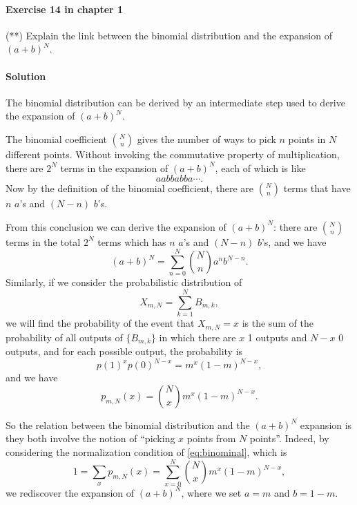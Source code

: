 \documentclass[hyperref, a4paper]{article}
\begin{document}
\paragraph{Exercise 14 in chapter 1} (**) Explain the link between the binomial distribution and the expansion of $(a+b)^N$.

\paragraph{Solution} The binomial distribution can be derived by an intermediate step used
to derive the expansion of $(a + b)^N$.

The binomial coefficient $\binom{N}{n}$ 
gives the number of ways to pick $n$ points in $N$ different points.
Without invoking the commutative property of multiplication,
there are $2^N$ terms in the expansion of $(a + b)^N$,
each of which is like 
\[
    aabbabba \cdots.
\]
Now by the definition of the binomial coefficient,
there are $\binom{N}{n}$ terms that have $n$ $a$'s and $(N-n)$ $b$'s.

From this conclusion we can derive the expansion of $(a + b)^N$:
there are $\binom{N}{n}$ terms in the total $2^N$ terms which has $n$ $a$'s and $(N-n)$ $b$'s,
and we have 
\begin{equation}
    (a + b)^N = \sum_{n=0}^N \binom{N}{n} a^n b^{N-n}.
\end{equation}
Similarly, if we consider the probabilistic distribution of 
\begin{equation}
    X_{m, N} = \sum_{k=1}^N B_{m, k},
\end{equation}
we will find the probability of the event that $X_{m, N} = x$ is the sum of the probability of 
all outputs of $\{B_{m, k}\}$ in which there are $x$ 1 outputs and $N - x$ 0 outputs,
and for each possible output, 
the probability is 
\[
    p(1)^x p(0)^{N-x} = m^x (1 - m)^{N-x},
\]
and we have 
\begin{equation}
    p_{m, N} (x) = \binom{N}{x} m^x (1 - m)^{N-x}.
    \label{eq:binominal}
\end{equation}

So the relation between the binomial distribution and the $(a + b)^N$ expansion is 
they both involve the notion of ``picking $x$ points from $N$ points''.
Indeed, by considering the normalization condition of \eqref{eq:binominal},
which is 
\begin{equation}
    1 = \sum_{x} p_{m, N}(x) = \sum_{x = 0}^N \binom{N}{x} m^x (1 - m)^{N-x},
\end{equation}
we rediscover the expansion of $(a + b)^N$,
where we set $a = m$ and $b = 1 - m$.
\end{document}
